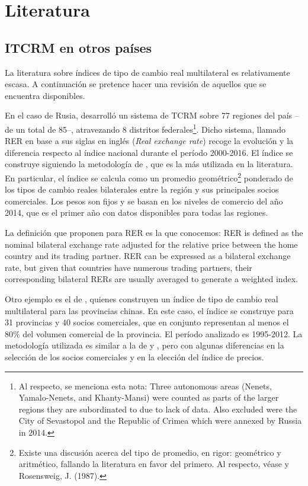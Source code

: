 \section{Literatura}\label{section2} 

\subsection{ITCRM en otros países}

La literatura sobre índices de tipo de cambio real multilateral es relativamente escasa. A continuación se pretence hacer una revisión de aquellos que se encuentra disponibles.

En el caso de Rusia, \cite{tochkov_2021} desarrolló un sistema de TCRM sobre 77 regiones del país –de un total de 85–, atravezando 8 distritos federales\footnote{Al respecto, se menciona esta nota: Three autonomous areas (Nenets, Yamalo-Nenets, and Khanty-Mansi) were counted as parts of the larger regions
they are subordinated to due to lack of data. Also excluded were the City of Sevastopol and the Republic of Crimea
which were annexed by Russia in 2014.}. Dicho sistema, llamado RER en base a sus siglas en inglés (\textit{Real exchange rate}) recoge la evolución y la diferencia respecto al índice nacional durante el período 2000-2016.
El índice se construye siguiendo la metodología de \cite{clark_1999}, que es la más utilizada en la literatura. En particular, el índice se calcula como un promedio geométrico\footnote{Existe una discusión acerca del tipo de promedio, en rigor: geométrico y aritmético, fallando la literatura en favor del primero. Al respecto, véase \cite{brodsky_1982} y Rosensweig, J. (1987).} ponderado de los tipos de cambio reales bilaterales entre la región y sus principales socios comerciales. Los pesos son fijos y se basan en los niveles de comercio del año 2014, que es el primer año con datos disponibles para todas las regiones.

La definición que proponen para RER es la que conocemos:
{
RER is defined as the nominal bilateral exchange rate
adjusted for the relative price between the home country and its trading partner. RER can be expressed
as a bilateral exchange rate, but given that countries have numerous trading partners, their corresponding
bilateral RERs are usually averaged to generate a weighted index.
}

Otro ejemplo es el de \cite{yan_2016}, quienes construyen un índice de tipo de cambio real multilateral para las provincias chinas. En este caso, el índice se construye para 31 provincias y 40 socios comerciales, que en conjunto representan al menos el 80\% del volumen comercial de la provincia. El período analizado es 1995-2012. La metodología utilizada es similar a la de \cite{clark_1999} y \cite{tochkov_2021}, pero con algunas diferencias en la selección de los socios comerciales y en la elección del índice de precios.

